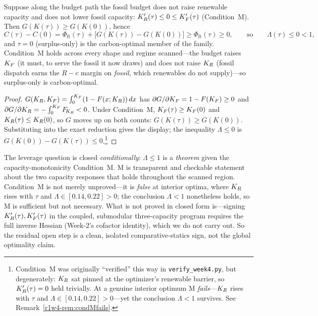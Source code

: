 \begin{theorem}\label{r1w4-thm:leveragebound}
Suppose along the budget path the fossil budget does not raise renewable capacity and does
not lower fossil capacity: $K_R'(\tau)\le0\le K_F'(\tau)$ (Condition~\textup{M}). Then
$G(K(\tau))\ge G(K(0))$, hence
\[
  C(\tau)-C(0)=\Phi_{\mathrm{ft}}(\tau)+\big[G(K(\tau))-G(K(0))\big]\ge\Phi_{\mathrm{ft}}(\tau)\ge0,
  \qquad\text{so}\qquad \Lambda(\tau)\le0<1,
\]
and $\tau=0$ (surplus-only) is the carbon-optimal member of the family. Condition~\textup{M}
holds across every shape and regime scanned---the budget raises $K_F$ (it must, to serve
the fossil it now draws) and does not raise $K_R$ (fossil dispatch earns the $R-c$ margin
on \emph{fossil}, which renewables do not supply)---so surplus-only is carbon-optimal.
\end{theorem}
\begin{proof}
$G(K_R,K_F)=\int_0^{K_F}(1-F(x;K_R))\,dx$ has $\partial G/\partial K_F=1-F(K_F)\ge0$ and
$\partial G/\partial K_R=-\int_0^{K_F}F_{\!K_R}<0$. Under Condition~\textup{M},
$K_F(\tau)\ge K_F(0)$ and $K_R(\tau)\le K_R(0)$, so $G$ moves up on both counts:
$G(K(\tau))\ge G(K(0))$. Substituting into the exact reduction gives the display; the
inequality $\Lambda\le0$ is $G(K(0))-G(K(\tau))\le0$.\footnote{Condition~M was originally
``verified'' this way in \texttt{verify\_week4.py}, but degenerately: $K_R$ sat pinned at the
optimizer's renewable barrier, so $K_R'(\tau)=0$ held trivially. At a genuine interior
optimum M \emph{fails}---$K_R$ rises with $\tau$ and $\Lambda\in[0.14,0.22]>0$---yet the
conclusion $\Lambda<1$ survives. See Remark~\ref{r1w4-rem:condMfails}.}
\end{proof}

\begin{remark}
The leverage question is closed \emph{conditionally}: $\Lambda\le1$ is a
\emph{theorem} given the capacity-monotonicity Condition~M. M is transparent and
checkable statement about the two capacity responses that holds throughout the scanned
region. Condition~M is not merely unproved---it is \emph{false} at interior optima, where
$K_R$ rises with $\tau$ and $\Lambda\in[0.14,0.22]>0$; the conclusion $\Lambda<1$ nonetheless
holds, so M is sufficient but not necessary. What is not proved in closed form is---signing
$K_R'(\tau),K_F'(\tau)$ in the coupled, submodular three-capacity program requires the full
inverse Hessian (Week-2's cofactor identity), which we do not carry out. So the residual
open step is a clean, isolated comparative-statics sign, not the global optimality claim.
\end{remark}

